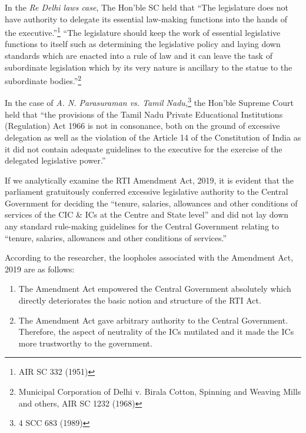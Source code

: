 \begin{multicols}{2}
\noi
In the \textit{Re Delhi laws case}, The Hon’ble SC held that “The legislature does not have authority
to delegate its essential law-making functions into the hands of the executive.”\footnote{AIR SC 332 (1951)} “The
legislature should keep the work of essential legislative functions to itself such as
determining the legislative policy and laying down standards which are enacted into a rule of
law and it can leave the task of subordinate legislation which by its very nature is ancillary to
the statue to the subordinate bodies.”\footnote{Municipal Corporation of Delhi v. Birala Cotton, Spinning and Weaving Mills and others, AIR SC 1232 (1968)}

\newpage

\noi
In the case of \textit{A. N. Parasuraman vs. Tamil Nadu,}\footnote{4 SCC 683 (1989)} the Hon’ble Supreme Court held that “the
provisions of the Tamil Nadu Private Educational Institutions (Regulation) Act 1966 is not in
consonance, both on the ground of excessive delegation as well as the violation of the Article
14 of the Constitution of India as it did not contain adequate guidelines to the executive for
the exercise of the delegated legislative power.”

\vspace{-.1cm}

\noi
If we analytically examine the RTI Amendment Act, 2019, it is evident that the parliament
gratuitously conferred excessive legislative authority to the Central Government for deciding
the “tenure, salaries, allowances and other conditions of services of the CIC \& ICs at the 
Centre and State level” and did not lay down any standard rule-making guidelines for the
Central Government relating to “tenure, salaries, allowances and other conditions of
services.”


\noi
According to the researcher, the loopholes associated with the Amendment Act, 2019 are as
follows:

\vspace{-.4cm}

\begin{enumerate}
\itemsep=0pt
\item The Amendment Act empowered the Central Government absolutely which directly
deteriorates the basic notion and structure of the RTI Act.

\item The Amendment Act gave arbitrary authority to the Central Government. Therefore,
the aspect of neutrality of the ICs mutilated and it made the ICs more trustworthy to
the government.


\end{enumerate}
\end{multicols}
